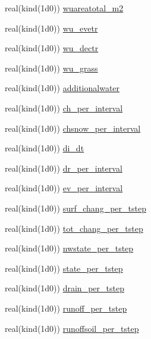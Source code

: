 \begin{DoxyCompactItemize}
\item 
real(kind(1d0)) \hyperlink{namespacesues__data_a4145456981d7aaa8f5b19ab3ea5f1781}{wuareatotal\+\_\+m2}
\item 
real(kind(1d0)) \hyperlink{namespacesues__data_a6aa0ce59c7eee4b94b9ee86ac5b555d0}{wu\+\_\+evetr}
\item 
real(kind(1d0)) \hyperlink{namespacesues__data_a087f298012279c621f24a283b360d592}{wu\+\_\+dectr}
\item 
real(kind(1d0)) \hyperlink{namespacesues__data_a56315a7303bf70155e92ead9b64493c2}{wu\+\_\+grass}
\item 
real(kind(1d0)) \hyperlink{namespacesues__data_a2c84a8e635e90b198dc0fd4c93c51ba4}{additionalwater}
\item 
real(kind(1d0)) \hyperlink{namespacesues__data_a79ed0c9098d69fcbc6ad9a95fddaf013}{ch\+\_\+per\+\_\+interval}
\item 
real(kind(1d0)) \hyperlink{namespacesues__data_af62ec721dfd084ec5bce9224750e1330}{chsnow\+\_\+per\+\_\+interval}
\item 
real(kind(1d0)) \hyperlink{namespacesues__data_a6f3357b61d4b1a639e99356c6a49ea6e}{di\+\_\+dt}
\item 
real(kind(1d0)) \hyperlink{namespacesues__data_aad693b9bca68a54522874f01bd0f2a18}{dr\+\_\+per\+\_\+interval}
\item 
real(kind(1d0)) \hyperlink{namespacesues__data_ac9d7bd8852ff457c5d8dd2588910ebf3}{ev\+\_\+per\+\_\+interval}
\item 
real(kind(1d0)) \hyperlink{namespacesues__data_a1848f093a3dd5ebdc1da775e9cda8509}{surf\+\_\+chang\+\_\+per\+\_\+tstep}
\item 
real(kind(1d0)) \hyperlink{namespacesues__data_a82ac11b95b008fb43921aac3b503efad}{tot\+\_\+chang\+\_\+per\+\_\+tstep}
\item 
real(kind(1d0)) \hyperlink{namespacesues__data_a9a093b62067234bd553e776c06ac4df9}{nwstate\+\_\+per\+\_\+tstep}
\item 
real(kind(1d0)) \hyperlink{namespacesues__data_abdb761c4b6b03cace33c5c54eb3607b2}{state\+\_\+per\+\_\+tstep}
\item 
real(kind(1d0)) \hyperlink{namespacesues__data_a96e76d9edd6c97fcdbc8f73047e189f3}{drain\+\_\+per\+\_\+tstep}
\item 
real(kind(1d0)) \hyperlink{namespacesues__data_a15eb03975ee429099b923fc02a2577ca}{runoff\+\_\+per\+\_\+tstep}
\item 
real(kind(1d0)) \hyperlink{namespacesues__data_a3b42551207483efdea0f50bba253afe4}{runoffsoil\+\_\+per\+\_\+tstep}

\end{DoxyCompactItemize}
